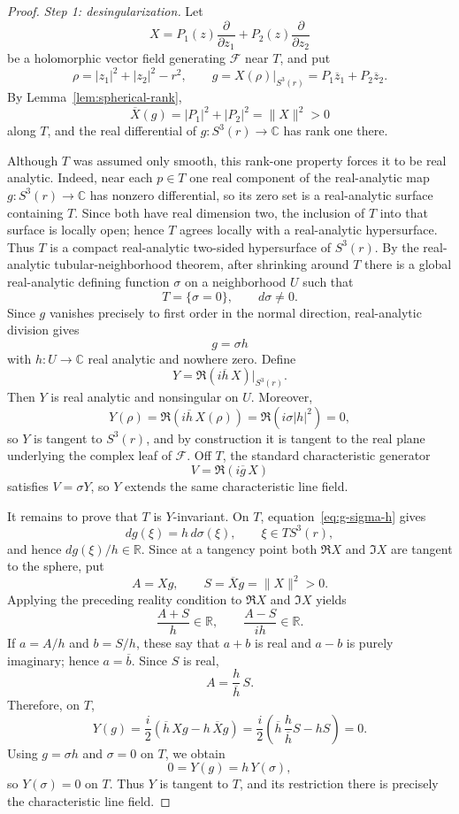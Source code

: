 \documentclass[11pt,reqno]{article}
\theoremstyle{remark}
\newcommand{\C}{\mathbb C}
\newcommand{\R}{\mathbb R}
\newcommand{\F}{\mathcal F}
\newcommand{\pd}{\partial}
\newcommand{\ol}{\overline}
\begin{document}
\begin{proof}
\emph{Step 1: desingularization.}
Let
\[
 X=P_1(z)\frac{\pd}{\pd z_1}+P_2(z)\frac{\pd}{\pd z_2}
\]
be a holomorphic vector field generating $\F$ near $T$, and put
\[
 \rho=|z_1|^2+|z_2|^2-r^2,\qquad
 g=X(\rho)|_{S^3(r)}=P_1\ol z_1+P_2\ol z_2.
\]
By Lemma~\ref{lem:spherical-rank},
\begin{equation}\label{eq:barXg}
 \ol X(g)=|P_1|^2+|P_2|^2=\|X\|^2>0
\end{equation}
along $T$, and the real differential of $g:S^3(r)\to\C$ has rank one there.

Although $T$ was assumed only smooth, this rank-one property forces it to be real analytic. Indeed, near each $p\in T$ one real component of the real-analytic map $g:S^3(r)\to\C$ has nonzero differential, so its zero set is a real-analytic surface containing $T$. Since both have real dimension two, the inclusion of $T$ into that surface is locally open; hence $T$ agrees locally with a real-analytic hypersurface. Thus $T$ is a compact real-analytic two-sided hypersurface of $S^3(r)$. By the real-analytic tubular-neighborhood theorem, after shrinking around $T$ there is a global real-analytic defining function $\sigma$ on a neighborhood $U$ such that
\[
 T=\{\sigma=0\},\qquad d\sigma\ne0.
\]
Since $g$ vanishes precisely to first order in the normal direction, real-analytic division gives
\begin{equation}\label{eq:g-sigma-h}
 g=\sigma h
\end{equation}
with $h:U\to\C$ real analytic and nowhere zero. Define
\begin{equation}\label{eq:Ydesing}
 Y=\Re(i\ol h\,X)|_{S^3(r)}.
\end{equation}
Then $Y$ is real analytic and nonsingular on $U$. Moreover,
\[
 Y(\rho)=\Re(i\ol h\,X(\rho))
          =\Re(i\sigma|h|^2)=0,
\]
so $Y$ is tangent to $S^3(r)$, and by construction it is tangent to the real plane underlying the complex leaf of $\F$. Off $T$, the standard characteristic generator
\[
 V=\Re(i\ol g\,X)
\]
satisfies $V=\sigma Y$, so $Y$ extends the same characteristic line field.

It remains to prove that $T$ is $Y$-invariant. On $T$, equation~\eqref{eq:g-sigma-h} gives
\[
 dg(\xi)=h\,d\sigma(\xi),\qquad \xi\in TS^3(r),
\]
and hence $dg(\xi)/h\in\R$. Since at a tangency point both $\Re X$ and $\Im X$ are tangent to the sphere, put
\[
 A=Xg,\qquad S=\ol Xg=\|X\|^2>0.
\]
Applying the preceding reality condition to $\Re X$ and $\Im X$ yields
\[
 \frac{A+S}{h}\in\R,
 \qquad
 \frac{A-S}{ih}\in\R.
\]
If $a=A/h$ and $b=S/h$, these say that $a+b$ is real and $a-b$ is purely imaginary; hence $a=\ol b$. Since $S$ is real,
\begin{equation}\label{eq:Xg-relation}
 A=\frac{h}{\ol h}\,S.
\end{equation}
Therefore, on $T$,
\[
 Y(g)=\frac{i}{2}(\ol h\,Xg-h\,\ol Xg)
     =\frac{i}{2}\left(\ol h\,\frac{h}{\ol h}S-hS\right)=0.
\]
Using $g=\sigma h$ and $\sigma=0$ on $T$, we obtain
\[
 0=Y(g)=h\,Y(\sigma),
\]
so $Y(\sigma)=0$ on $T$. Thus $Y$ is tangent to $T$, and its restriction there is precisely the characteristic line field.


\end{proof}
\end{document}
